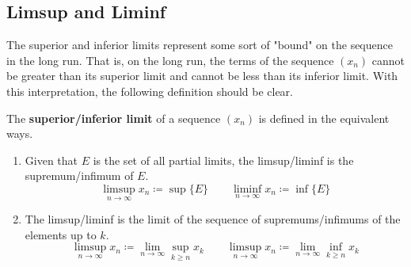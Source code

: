 \subsection{Limsup and Liminf} 

  The superior and inferior limits represent some sort of "bound" on the sequence in the long run. That is, on the long run, the terms of the sequence $(x_n)$ cannot be greater than its superior limit and cannot be less than its inferior limit. With this interpretation, the following definition should be clear. 

  \begin{definition}
    The \textbf{superior/inferior limit} of a sequence $(x_n)$ is defined in the equivalent ways. 
    \begin{enumerate}
      \item Given that $E$ is the set of all partial limits, the limsup/liminf is the supremum/infimum of $E$. 
      \begin{equation}
        \limsup_{n \rightarrow \infty} x_n \coloneqq \sup\{E\} \qquad \liminf_{n \rightarrow \infty} x_n \coloneqq \inf\{E\}
      \end{equation}
      \item The limsup/liminf is the limit of the sequence of supremums/infimums of the elements up to $k$.  
      \begin{equation}
        \limsup_{n \rightarrow \infty} x_n \coloneqq \lim_{n \rightarrow \infty} \sup_{k \geq n} x_k \qquad \limsup_{n \rightarrow \infty} x_n \coloneqq \lim_{n \rightarrow \infty} \inf_{k \geq n} x_k 
      \end{equation}
    \end{enumerate}

    \begin{figure}[H]
      \centering
      \begin{subfigure}[b]{0.48\textwidth}
        \centering
\end{subfigure}
\end{figure}
\end{definition}
